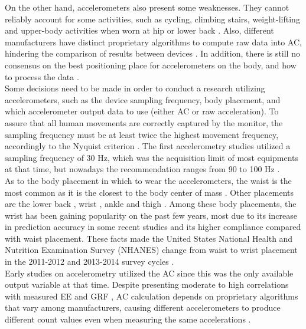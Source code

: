\documentclass[11pt]{article}
\begin{document}
On the other hand, accelerometers also present some weaknesses. They cannot reliably account for some activities, such as cycling, climbing stairs, weight-lifting and upper-body activities when worn at hip or lower back \cite{Strath_2013}. Also, different manufacturers have distinct proprietary algorithms to compute raw data into AC, hindering the comparison of results between devices \cite{Plasqui_2013}. In addition, there is still no consensus on the best positioning place for accelerometers on the body, and how to process the data \cite{Troiano_2014}. \\

Some decisions need to be made in order to conduct a research utilizing accelerometers, such as the device sampling frequency, body placement, and which accelerometer output data to use (either AC or raw acceleration). To assure that all human movements are correctly captured by the monitor, the sampling frequency must be at least twice the highest movement frequency, accordingly to the Nyquist criterion \cite{Chen_2012}. The first accelerometry studies utilized a sampling frequency of 30 Hz, which was the acquisition limit of most equipments at that time, but nowadays the recommendation ranges from 90 to 100 Hz \cite{Migueles_2017}. \\

As to the body placement in which to wear the accelerometers, the waist is the most common as it is the closest to the body center of mass \cite{Chen_2005, Mendes_2018}. Other placements are the lower back \cite{Brandes_2012}, wrist \cite{Hildebrand_2017}, ankle \cite{Fortune_2014} and thigh \cite{Montoye_2016a}. Among these body placements, the wrist has been gaining popularity on the past few years, most due to its increase in prediction accuracy in some recent studies \cite{Phillips_2013, Hildebrand_2017} and its higher compliance compared with waist placement. These facts made the United States National Health and Nutrition Examination Survey (NHANES) change from waist to wrist placement in the 2011-2012 and 2013-2014 survey cycles \cite{Troiano_2014}. \\

Early studies on accelerometry utilized the AC since this was the only available output variable at that time. Despite presenting moderate to high correlations with measured EE \cite{Nichols_1999, Freedson_1998} and GRF \cite{Janz_2003}, AC calculation depends on proprietary algorithms that vary among manufacturers, causing different accelerometers to produce different count values even when measuring the same accelerations \cite{Chen_2012, Plasqui_2013}. \\
\end{document}
